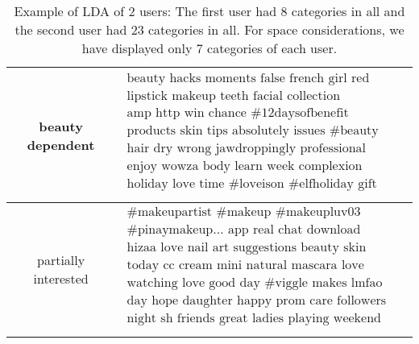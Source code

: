 \documentclass[11pt]{article}
\begin{document}
\begin{table}[!ht]
 \begin{center}
  \begin{tabular}{|c| c |}
  \hline
    beauty dependent & $\begin{array}{l}
                         \textrm{beauty   hacks   moments   false   french   girl   red}\\
			 \textrm{lipstick   makeup   teeth   facial   collection   colorlicious   bloom}\\
\textrm{amp   http   win   chance   \#12daysofbenefit   cosmetic   jewelry}\\
\textrm{products   skin   tips   absolutely   issues   \#beauty   glowing}\\
\textrm{hair   dry   wrong   jawdroppingly   professional   damas   man}\\
\textrm{enjoy   wowza   body   learn   week   complexion   palette}\\
\textrm{holiday   love   time   \#loveison   \#elfholiday   gift   wha}\\
                       \end{array}$\\
   \hline
   partially interested &  $\begin{array}{l}
			     \textrm{\#makeupartist   \#makeup \#makeupluv03  \#makeupblogger   blogs   team}\\  
                            \textrm{\#pinaymakeup…  app   real   chat   download   \#instagramers!   messaging}\\    
			     \textrm{hizaa love   nail   art   suggestions   beauty    skin   awake}\\
			    \textrm{today   cc   cream   mini   natural   mascara   love}\\
			    \textrm{watching   love   good   day   \#viggle   makes   lmfao}\\  
			    \textrm{day   hope   daughter   happy   prom   care   followers}\\ 
			    \textrm{night   sh   friends   great   ladies   playing   weekend}\\ 
                           \end{array}$  \\
   \hline
  \end{tabular}
\end{center}
\caption{\footnotesize Example of LDA of 2 users: The first user had 8 categories in all and the second user had 
23 categories in all. For space considerations, we have displayed only 7 categories of each user.}
\label{table:LDA}
\end{table}
\end{document}
